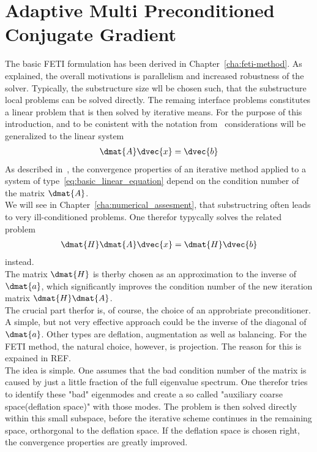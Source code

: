 \chapter{Adaptive Multi Preconditioned Conjugate Gradient}

The basic FETI formulation has been derived in Chapter~\ref{cha:feti-method}. As explained, the overall motivations is parallelism and increased robustness of the solver. Typically, the substructure size wll be chosen such, that the substructure local problems can be solved directly. The remaing interface problems constitutes a linear problem that is then solved by iterative means. For the purpose of this introduction, and to be conistent with the notation from~\cite{Spillane2016} considerations will be generalized to the linear system
\begin{align}
\dmat{A} \dvec{x} = \dvec{b}
\label{eq:basic_linear_equation}
\end{align}
As described in~\cite{Kaniel1966}\cite{Saad2003}, the convergence properties of an iterative method applied to a system of type~\eqref{eq:basic_linear_equation} depend on the condition number of the matrix $\dmat{A}$.\\
We will see in Chapter~\ref{cha:numerical_assesment}, that substructring often leads to very ill-conditioned problems. One therefor typycally solves the related problem
\begin{align}
\dmat{H}\dmat{A} \dvec{x} = \dmat{H}\dvec{b}
\label{eq:preconditioned_linear_equation}
\end{align}
instead.\\
The matrix $\dmat{H}$ is therby chosen as an approximation to the inverse of $\dmat{a}$, which significantly improves the condition number of the new iteration matrix $\dmat{H}\dmat{A}$.\\
The crucial part therfor is, of course, the choice of an approbriate preconditioner. A simple, but not very effective approach could be the inverse of the diagonal of $\dmat{a}$. Other types are deflation, augmentation as well as balancing. For the FETI method, the natural choice, however, is projection. The reason for this is expained in REF.\\
The idea is simple. One assumes that the bad condition number of the matrix is caused by just a little fraction of the full eigenvalue spectrum. One therefor tries to identify these "bad" eigenmodes and create a so called "auxiliary coarse space(deflation space)" with those modes. The problem is then solved directly within this small subspace, before the iterative scheme continues in the remaining space, orthorgonal to the deflation space. If the deflation space is chosen right, the convergence properties are greatly improved.\\

